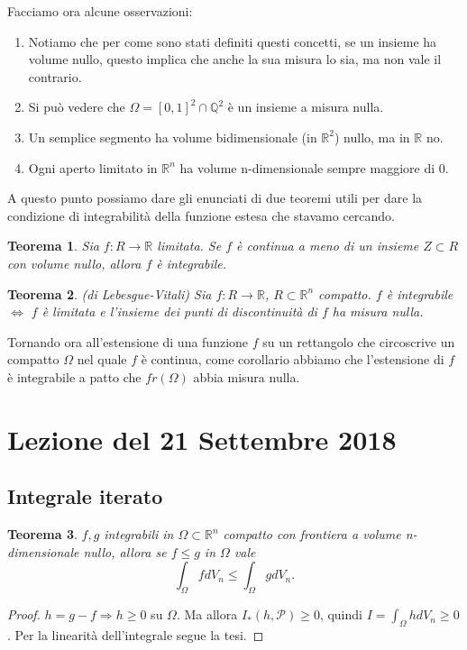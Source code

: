 \documentclass[10pt]{article}
\theoremstyle{plain}
\newtheorem{thm}{Teorema}[section]
\theoremstyle{definition}
\begin{document}
Facciamo ora alcune osservazioni:
\begin{enumerate}
    \item Notiamo che per come sono stati definiti questi concetti, se un insieme ha volume nullo, questo implica che anche la sua misura lo sia, ma non vale il contrario.
    \item Si può vedere che $\Omega = [0,1]^2\cap \mathbb{Q}^2$ è un insieme a misura nulla.
    \item Un semplice segmento ha volume bidimensionale (in $\mathbb{R}^2$) nullo, ma in $\mathbb{R}$ no.
    \item Ogni aperto limitato in $\mathbb{R}^n$ ha volume n-dimensionale sempre maggiore di 0.
\end{enumerate}
\bigskip
A questo punto possiamo dare gli enunciati di due teoremi utili per dare la condizione di integrabilità della funzione estesa che stavamo cercando.
\begin{thm}
  Sia $f:R\to \mathbb{R}$ limitata. Se $f$ è continua a meno di un insieme $Z\subset R$ con volume nullo, allora $f$ è integrabile.
\end{thm}
\begin{thm}
  (di Lebesgue-Vitali)
  Sia $f:R\to \mathbb{R}$, $R \subset \mathbb{R}^n$ compatto. $f$ è integrabile $\Leftrightarrow$ $f$ è limitata e l'insieme dei punti di discontinuità di $f$ ha misura nulla.
\end{thm}
\bigskip Tornando ora all'estensione di una funzione $f$ su un rettangolo che circoscrive un compatto $\Omega$ nel quale $f$ è continua, come corollario abbiamo che l'estensione di $f$ è integrabile a patto che $fr(\Omega)$ abbia misura nulla. 

 \section{Lezione del 21 Settembre 2018}
 \subsection{Integrale iterato}
 \begin{thm}
   $f,g$ integrabili in $\Omega \subset \mathbb{R}^n$ compatto con frontiera a volume n-dimensionale nullo, allora se $f\leq g$ in $\Omega$ vale
   $$\int_\Omega fdV_n\leq \int_\Omega gdV_n.$$
 \end{thm}
\begin{proof}
$h=g-f\Rightarrow h\geq 0$ su $\Omega$. Ma allora $I_*(h,\mathcal{P})\geq 0$, quindi $I=\int_\Omega hdV_n \geq 0$. Per la linearità dell'integrale segue la tesi.
\end{proof}
\end{document}
